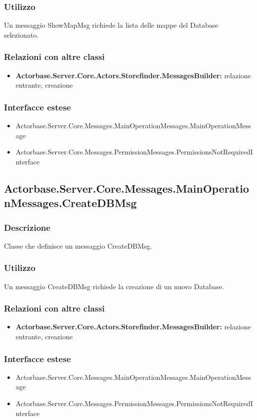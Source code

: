 \documentclass[a4paper]{article}
\begin{document}
			\subsubsection{Utilizzo}
				Un messaggio ShowMapMsg richiede la lista delle mappe del Database selezionato.
			\subsubsection{Relazioni con altre classi}
			\begin{itemize}
				\item \textbf{Actorbase.Server.Core.Actors.Storefinder.MessagesBuilder:} relazione entrante, creazione
			\end{itemize}
			\subsubsection{Interfacce estese}
			\begin{itemize}
				\item Actorbase.Server.Core.Messages.MainOperationMessages.MainOperationMessage
				\item Actorbase.Server.Core.Messages.PermissionMessages.PermissionsNotRequiredInterface
			\end{itemize}

			\subsection{Actorbase.Server.Core.Messages.MainOperationMessages.CreateDBMsg}
			\subsubsection{Descrizione}
				Classe che definisce un messaggio CreateDBMsg.
			\subsubsection{Utilizzo}
				Un messaggio CreateDBMsg richiede la creazione di un nuovo Database.
			\subsubsection{Relazioni con altre classi}
			\begin{itemize}
				\item \textbf{Actorbase.Server.Core.Actors.Storefinder.MessagesBuilder:} relazione entrante, creazione
			\end{itemize}
			\subsubsection{Interfacce estese}
			\begin{itemize}
				\item Actorbase.Server.Core.Messages.MainOperationMessages.MainOperationMessage
				\item Actorbase.Server.Core.Messages.PermissionMessages.PermissionsNotRequiredInterface
			\end{itemize}
\end{document}
